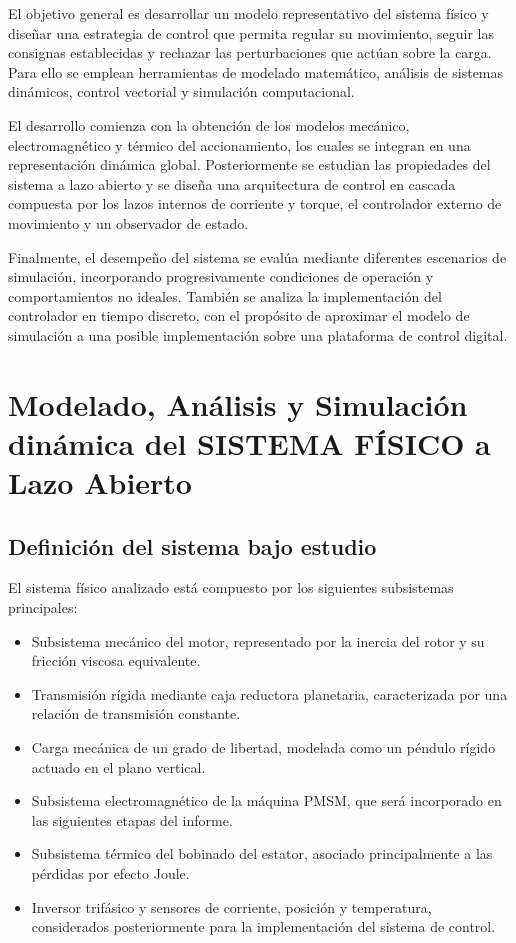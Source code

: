 \documentclass[10pt,a4paper]{article}
\begin{document}
El objetivo general es desarrollar un modelo representativo del sistema físico y diseñar una estrategia de control que permita regular su movimiento, seguir las consignas establecidas y rechazar las perturbaciones que actúan sobre la carga. Para ello se emplean herramientas de modelado matemático, análisis de sistemas dinámicos, control vectorial y simulación computacional.

El desarrollo comienza con la obtención de los modelos mecánico, electromagnético y térmico del accionamiento, los cuales se integran en una representación dinámica global. Posteriormente se estudian las propiedades del sistema a lazo abierto y se diseña una arquitectura de control en cascada compuesta por los lazos internos de corriente y torque, el controlador externo de movimiento y un observador de estado.

Finalmente, el desempeño del sistema se evalúa mediante diferentes escenarios de simulación, incorporando progresivamente condiciones de operación y comportamientos no ideales. También se analiza la implementación del controlador en tiempo discreto, con el propósito de aproximar el modelo de simulación a una posible implementación sobre una plataforma de control digital.

\section{Modelado, Análisis y Simulación dinámica del SISTEMA FÍSICO a Lazo Abierto}

\subsection{Definición del sistema bajo estudio}

El sistema físico analizado está compuesto por los siguientes subsistemas principales:

\begin{itemize}[leftmargin=*]
    \item Subsistema mecánico del motor, representado por la inercia del rotor y su fricción viscosa equivalente.
    \item Transmisión rígida mediante caja reductora planetaria, caracterizada por una relación de transmisión constante.
    \item Carga mecánica de un grado de libertad, modelada como un péndulo rígido actuado en el plano vertical.
    \item Subsistema electromagnético de la máquina PMSM, que será incorporado en las siguientes etapas del informe.
    \item Subsistema térmico del bobinado del estator, asociado principalmente a las pérdidas por efecto Joule.
    \item Inversor trifásico y sensores de corriente, posición y temperatura, considerados posteriormente para la implementación del sistema de control.
\end{itemize}
\end{document}
